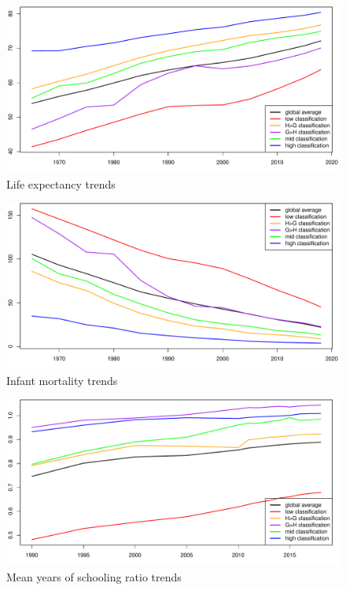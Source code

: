 \documentclass[12pt]{article}
\begin{document}
\begin{figure}[!htb]
    \centering
    \caption{Life expectancy trends}
    \label{trends_life}
    \includegraphics[width=\textwidth]{trend_life_exp_wpp.pdf}
\end{figure}
\begin{figure}[!htb]
    \centering
    \caption{Infant mortality trends}
    \label{trends_imr}
    \includegraphics[width=\textwidth]{trend_imr_wpp.pdf}
\end{figure}
\begin{figure}[!htb]
    \centering
    \caption{Mean years of schooling ratio trends}
    \label{trends_mys}
    \includegraphics[width=\textwidth]{trend_mys_ratio_hdr.pdf}
\end{figure}
\end{document}
